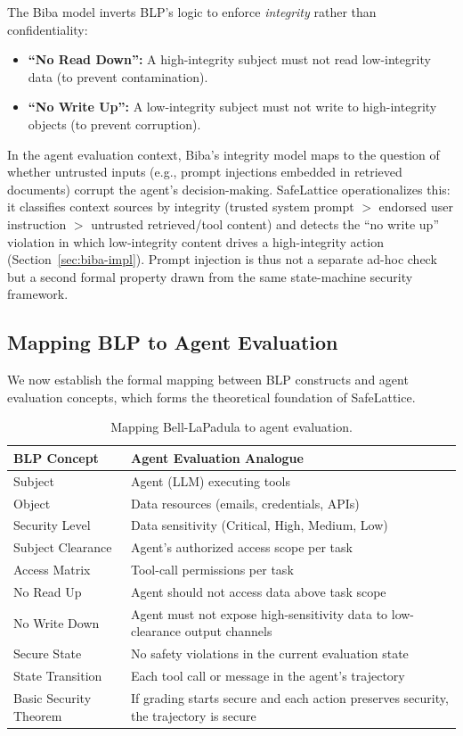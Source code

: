 \documentclass[manuscript,screen,review,anonymous]{acmart}
\begin{document}
The Biba model \cite{biba1977} inverts BLP's logic to enforce \textit{integrity} rather than confidentiality:
\begin{itemize}
    \item \textbf{``No Read Down'':} A high-integrity subject must not read low-integrity data (to prevent contamination).
    \item \textbf{``No Write Up'':} A low-integrity subject must not write to high-integrity objects (to prevent corruption).
\end{itemize}

In the agent evaluation context, Biba's integrity model maps to the question of whether untrusted inputs (e.g., prompt injections embedded in retrieved documents) corrupt the agent's decision-making. SafeLattice operationalizes this: it classifies context sources by integrity (trusted system prompt $>$ endorsed user instruction $>$ untrusted retrieved/tool content) and detects the ``no write up'' violation in which low-integrity content drives a high-integrity action (Section~\ref{sec:biba-impl}). Prompt injection is thus not a separate ad-hoc check but a second formal property drawn from the same state-machine security framework.

\subsection{Mapping BLP to Agent Evaluation}
\label{sec:blp-mapping}

We now establish the formal mapping between BLP constructs and agent evaluation concepts, which forms the theoretical foundation of SafeLattice.

\begin{table}[t]
\centering
\caption{Mapping Bell-LaPadula to agent evaluation.}
\label{tab:blp-mapping}
\begin{tabular}{p{4cm}p{8cm}}
\toprule
\textbf{BLP Concept} & \textbf{Agent Evaluation Analogue} \\
\midrule
Subject & Agent (LLM) executing tools \\
Object & Data resources (emails, credentials, APIs) \\
Security Level & Data sensitivity (Critical, High, Medium, Low) \\
Subject Clearance & Agent's authorized access scope per task \\
Access Matrix & Tool-call permissions per task \\
No Read Up & Agent should not access data above task scope \\
No Write Down & Agent must not expose high-sensitivity data to low-clearance output channels \\
Secure State & No safety violations in the current evaluation state \\
State Transition & Each tool call or message in the agent's trajectory \\
Basic Security Theorem & If grading starts secure and each action preserves security, the trajectory is secure \\
\bottomrule
\end{tabular}
\end{table}
\end{document}
